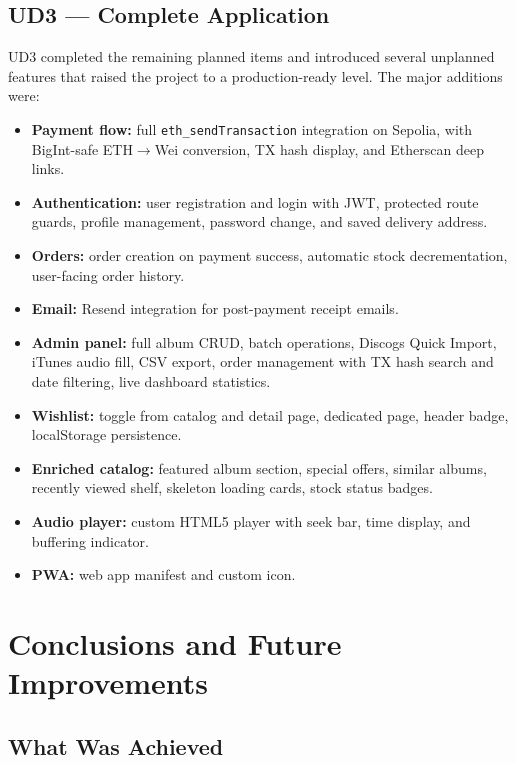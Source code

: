 \documentclass[11pt, a4paper]{report}
\begin{document}
\section{UD3 — Complete Application}

UD3 completed the remaining planned items and introduced several unplanned features that raised the project to a production-ready level. The major additions were:

\begin{itemize}
  \item \textbf{Payment flow:} full \texttt{eth\_sendTransaction} integration on Sepolia, with BigInt-safe ETH$\rightarrow$Wei conversion, TX hash display, and Etherscan deep links.
  \item \textbf{Authentication:} user registration and login with JWT, protected route guards, profile management, password change, and saved delivery address.
  \item \textbf{Orders:} order creation on payment success, automatic stock decrementation, user-facing order history.
  \item \textbf{Email:} Resend integration for post-payment receipt emails.
  \item \textbf{Admin panel:} full album CRUD, batch operations, Discogs Quick Import, iTunes audio fill, CSV export, order management with TX hash search and date filtering, live dashboard statistics.
  \item \textbf{Wishlist:} toggle from catalog and detail page, dedicated page, header badge, localStorage persistence.
  \item \textbf{Enriched catalog:} featured album section, special offers, similar albums, recently viewed shelf, skeleton loading cards, stock status badges.
  \item \textbf{Audio player:} custom HTML5 player with seek bar, time display, and buffering indicator.
  \item \textbf{PWA:} web app manifest and custom icon.
\end{itemize}

\chapter{Conclusions and Future Improvements}

\section{What Was Achieved}
\end{document}
